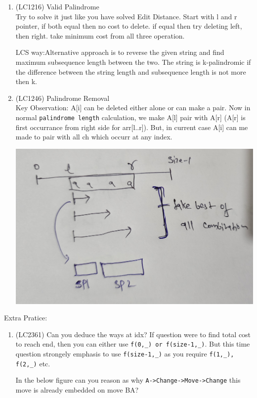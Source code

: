 \begin{exerciseHints}
\begin{enumerate}
        \item (LC1216) Valid Palindrome\\ Try to solve it just like you have solved Edit Distance. Start with l and r pointer, if both equal then no cost to delete. if equal then try deleting left, then right.
        take minimum cost from all three operation.

        LCS way:Alternative approach is to reverse the given string and find maximum subsequence length between the two. The string is k-palindromic if the difference between the string length and subsequence length is not more then k.
        
        \item (LC1246) Palindrome Removal \\Key Observation: A[i] can be deleted either alone or can make a pair. Now in normal \verb|palindrome length| calculation, we make A[l] pair with A[r] (A[r] is first occurrance from right side for arr[l..r]). But, in current case A[i] can me made to pair with all ch which occurr at any index.
        
        \includegraphics[width=\marginparwidth]{./resources/LC1246_p1.jpg}
    \end{enumerate}

    Extra Pratice:
    \begin{enumerate}
        \item (LC2361) Can you deduce the ways at idx? If question were to find total cost to reach end, then you can either use \verb|f(0,_) or f(size-1,_)|. But this time question strongely emphasis to use \verb|f(size-1,_)| as you require \verb|f(1,_), f(2,_)| etc.
        
        In the below figure can you reason as why \verb|A->Change->Move->Change| this move is already embedded on move BA?
        

\end{enumerate}
\end{exerciseHints}
